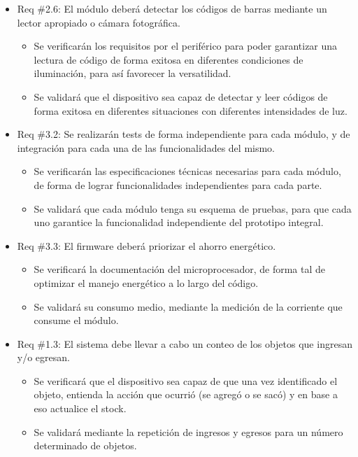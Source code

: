 \documentclass[
11pt, %
codirector, %
]{charter}
\begin{document}
\begin{itemize}
\item Req \#2.6: El módulo deberá detectar los códigos de barras mediante un lector apropiado o cámara fotográfica.

\begin{itemize}
	\item Se verificarán los requisitos por el periférico para poder garantizar una lectura de código de forma exitosa en diferentes condiciones de iluminación, para así favorecer la versatilidad.
	\item Se validará que el dispositivo sea capaz de detectar y leer códigos de forma exitosa en diferentes situaciones con diferentes intensidades de luz.
\end{itemize}

\item Req \#3.2: Se realizarán tests de forma independiente para cada módulo, y de integración para cada una de las funcionalidades del mismo.

\begin{itemize}
	\item Se verificarán las especificaciones técnicas necesarias para cada módulo, de forma de lograr funcionalidades independientes para cada parte.
	\item Se validará que cada módulo tenga su esquema de pruebas, para que cada uno garantice la funcionalidad independiente del prototipo integral.
\end{itemize}

\item Req \#3.3: El firmware deberá priorizar el ahorro energético.

\begin{itemize}
	\item Se verificará la documentación del microprocesador, de forma tal de optimizar el manejo energético a lo largo del código.
	\item Se validará su consumo medio, mediante la medición de la corriente que consume el módulo.
\end{itemize}

\item Req \#1.3: El sistema debe llevar a cabo un conteo de los objetos que ingresan y/o egresan.

\begin{itemize}
	\item Se verificará que el dispositivo sea capaz de que una vez identificado el objeto, entienda la acción que ocurrió (se agregó o se sacó) y en base a eso actualice el stock.
	\item Se validará mediante la repetición de ingresos y egresos para un número determinado de objetos.
\end{itemize}


\end{itemize}
\end{document}
